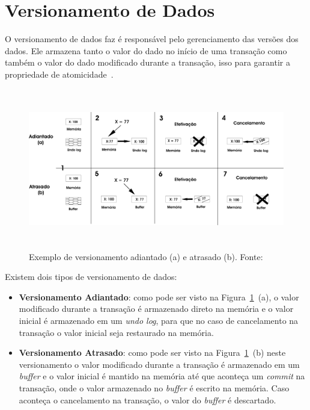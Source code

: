 \documentclass[ti]{texufpel}
\begin{document}
\section{Versionamento de Dados}

O versionamento de dados faz é responsável pelo gerenciamento das versões dos dados. Ele armazena tanto o valor do dado no início de uma transação como também o valor do dado modificado durante a transação, isso para garantir a propriedade de atomicidade~\cite{baldassinTese09}.

\begin{figure}[!htp]
\centering
\includegraphics[height=7cm]{Imagens/versionamento.png}
\caption{Exemplo de versionamento adiantado (a) e atrasado (b). Fonte:~\cite{baldassinTese09}}
\label{figuraVersionamento}
\end{figure}

Existem dois tipos de versionamento de dados:

\begin{itemize}
 \item \textbf{Versionamento Adiantado}: como pode ser visto na Figura~\ref{figuraVersionamento}~(a), o valor modificado durante a transação é armazenado direto na memória e o valor inicial é armazenado em um \emph{undo log}, para que no caso de cancelamento na transação o valor inicial seja restaurado na memória.

 \item \textbf{Versionamento Atrasado}: como pode ser visto na Figura~\ref{figuraVersionamento}~(b) neste versionamento o valor modificado durante a transação é armazenado em um \emph{buffer} e o valor inicial é mantido na memória até que aconteça um \emph{commit} na transação, onde o valor armazenado no \emph{buffer} é escrito na memória. Caso aconteça o cancelamento na transação, o valor do \emph{buffer} é descartado.
\end{itemize}
\end{document}

